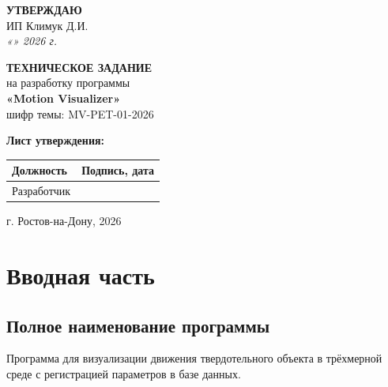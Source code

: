 \documentclass[a4paper,14pt]{extarticle}
\begin{document}
\begin{titlepage}
\begin{center}
\vspace*{1cm}
{\Large \textbf{УТВЕРЖДАЮ}} \\
\vspace{0.3cm}
{\large ИП Климук Д.И.} \\
\vspace{0.2cm}
\textit{«\underline{\hspace{1cm}}» \underline{\hspace{2cm}} 2026 г.}
\vspace{2cm}

{\Large \textbf{ТЕХНИЧЕСКОЕ ЗАДАНИЕ}} \\
\vspace{0.5cm}
{\large на разработку программы} \\
\vspace{0.5cm}
{\huge \textbf{«Motion Visualizer»}} \\
\vspace{0.5cm}
{\large шифр темы: MV-PET-01-2026}
\vspace{2cm}

\begin{flushleft}
\textbf{Лист утверждения:} \\
\vspace{0.5cm}
\begin{tabular}{|p{7cm}|p{4cm}|}
\hline
\textbf{Должность} & \textbf{Подпись, дата} \\
\hline
Разработчик & \underline{\hspace{4cm}} \\
\hline
\end{tabular}
\end{flushleft}

\vfill
\begin{center}
г. Ростов-на-Дону, 2026
\end{center}
\end{center}
\end{titlepage}

\tableofcontents
\newpage

\section{Вводная часть}

\subsection{Полное наименование программы}
Программа для визуализации движения твердотельного объекта в трёхмерной среде с регистрацией параметров в базе данных.
\end{document}

